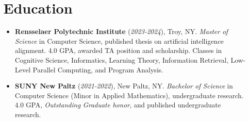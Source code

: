 \documentclass[11pt]{article}
\begin{document}
\section*{Education}
\begin{itemize}
    \itemsep0em

    \item \textbf{Rensselaer Polytechnic Institute} (\textit{2023-2024}), Troy, NY. \textit{Master of Science} in Computer Science, published thesis on artificial intelligence alignment.  4.0 GPA, awarded TA position and scholarship.  Classes in Cognitive Science, Informatics, Learning Theory, Information Retrieval, Low-Level Parallel Computing, and Program Analysis.
    
    \item \textbf{SUNY New Paltz} (\textit{2021-2022}), New Paltz, NY. \textit{Bachelor of Science} in Computer Science (Minor in Applied Mathematics), undergraduate research. 4.0 GPA, \textit{Outstanding Graduate honor}, and published undergraduate research.

\end{itemize}
\end{document}

